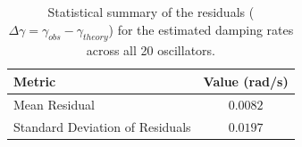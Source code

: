 \documentclass[]{article}
\begin{document}
\begin{table}[h!]
    \centering
    \caption{Statistical summary of the residuals ($\Delta\gamma = \gamma_{obs} - \gamma_{theory}$) for the estimated damping rates across all 20 oscillators.}
    \label{tab:residuals}
    \begin{tabular}{lc}
        \hline
        \hline
        Metric & Value (rad/s) \\
        \hline
        Mean Residual & $0.0082$ \\
        Standard Deviation of Residuals & $0.0197$ \\
        \hline
    \end{tabular}
\end{table}
\end{document}
